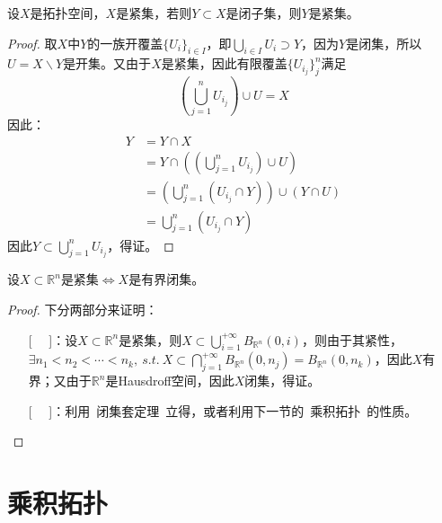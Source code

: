 \documentclass[lang=cn,10pt,device=pad]{elegantbook}
\newcommand{\cusong}{\CJKfamily{cusong}}%
\newcommand{\lei}[1]{~\textcolor{myblu}{\cusong{#1}}~}
\newcommand{\lanse}[1]{~\textcolor{myblu}{#1}~}
\newcommand{\st}{~s.t.~}
\newcommand{\dabing}{\displaystyle\bigcup}
\newcommand{\dajiao}{\displaystyle\bigcap}
\newcommand{\dkh}[1]{\{#1\}}
\newcommand{\xkh}[1]{\left(#1\right)}
\newcommand{\chadiao}{\backslash}
\begin{document}
\begin{proposition}[紧集的闭子集是紧子集]
	设$X$是拓扑空间，$X$是紧集，若则$Y\subset X$是闭子集，则$Y$是紧集。
\end{proposition}
\begin{proof}
	取$X$中$Y$的一族开覆盖$\dkh{U_{i}}_{i\in I}$，即$\dabing_{i\in I}U_{i}\supset Y$，因为$Y$是闭集，所以$U = X\chadiao Y$是开集。又由于$X$是紧集，因此有限覆盖$\dkh{U_{i_{j}}}_{j}^{n}$满足$$(\dabing_{j=1}^{n}U_{i_{j}})\cup U = X$$因此：
	\begin{equation*}
		\begin{aligned}
			Y & = Y\cap X\\
			& = Y\cap\xkh{(\dabing_{j=1}^{n}U_{i_{j}})\cup U}\\
			& = (\dabing_{j=1}^{n}(U_{i_{j}}\cap Y))\cup (Y\cap U)\\
			&=\dabing_{j=1}^{n}(U_{i_{j}}\cap Y)
		\end{aligned}
	\end{equation*}
	因此$Y\subset \dabing_{j=1}^{n}U_{i_{j}}$，得证。
\end{proof}
\begin{theorem}\label{c3-t2}
	设$X\subset \mathbb{R}^{n}$是紧集$\iff X$是有界闭集。
\end{theorem}
\begin{proof}
下分两部分来证明：
	\begin{enumerate}
		\item[[\lei{$\Rightarrow $}]]：设$X\subset \mathbb{R}^{n}$是紧集，则$X\subset \dabing_{i=1}^{+\infty}B_{\mathbb{R}^{n}}(0,i)$，则由于其紧性，$\exists n_{1}<n_{2}<\cdots<n_{k} , \st X\subset \dajiao_{j=1}^{+\infty}B_{\mathbb{R}^{n}}(0,n_{j}) = B_{\mathbb{R}^{n}}(0,n_{k})$，因此$X$有界；又由于$\mathbb{R}^{n}$是Hausdroff空间，因此$X$闭集，得证。
		\item[[\lei{$\Leftarrow $}]]：利用\lanse{闭集套定理}立得，或者利用下一节的\lanse{乘积拓扑}的性质。
	\end{enumerate}
\end{proof}
\section{乘积拓扑}
\end{document}
